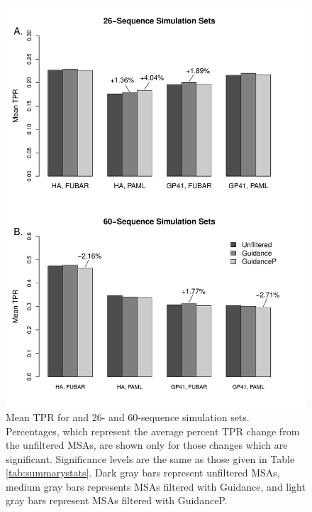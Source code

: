 \documentclass[11pt]{article}
\begin{document}
\begin{figure}[H]
\centerline{\includegraphics[width=4.75in]{Figures/barplot.pdf}}
\caption{\label{barplot} Mean TPR for and 26- and  60-sequence simulation sets. Percentages, which represent the average percent TPR change from the unfiltered MSAs, are shown only for those changes which are significant. Significance levels are the same as those given in Table \ref{tab:summarystats}. Dark gray bars represent unfiltered MSAs, medium gray bars represents MSAs filtered with Guidance, and light gray bars represent MSAs filtered with GuidanceP.}
\end{figure}

\bigskip
\end{document}
